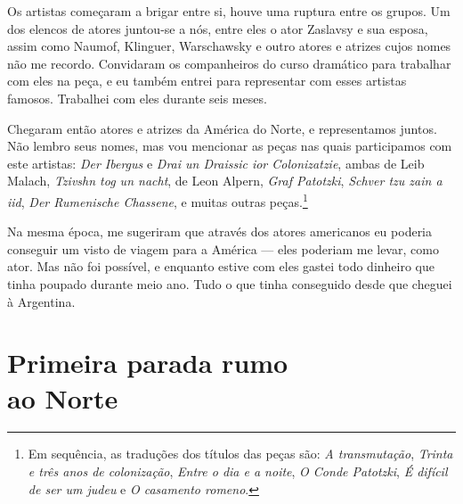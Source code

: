 
Os artistas começaram a brigar entre si, houve uma ruptura entre os grupos. Um dos 
elencos de atores juntou-se a nós, entre eles o ator Zaslavsy e sua esposa, assim como Naumof, Klinguer,
Warschawsky e outro atores e atrizes cujos nomes não me recordo.
Convidaram os companheiros do curso dramático para trabalhar com eles na
peça, e eu também entrei para representar com esses artistas famosos. Trabalhei com eles durante seis meses.

Chegaram então atores e atrizes da América do Norte, e
representamos juntos. Não lembro seus nomes, mas vou mencionar as peças nas
quais participamos com este artistas: \textit{Der Ibergus} e \textit{Drai un Draissic ior Colonizatzie}, ambas de Leib Malach, \textit{Tzivshn tog un nacht}, de Leon Alpern, \textit{Graf Patotzki}, \textit{Schver tzu zain a iid}, \textit{Der Rumenische Chassene}, e
muitas outras peças.\footnote{Em sequência, as traduções dos títulos das peças são: \textit{A transmutação}, \textit{Trinta e três anos de colonização}, \textit{Entre o dia e a noite}, \textit{O Conde Patotzki}, \textit{É difícil de ser um judeu} e \textit{O casamento romeno}.}

Na mesma época, me sugeriram que através dos atores americanos 
eu poderia conseguir um visto de viagem para a América --- eles poderiam me levar, como ator. Mas não foi possível, e
enquanto estive com eles gastei todo dinheiro que tinha poupado
durante meio ano. Tudo o que tinha conseguido desde que cheguei à Argentina.



\chapter*{Primeira parada rumo\\ao Norte}

